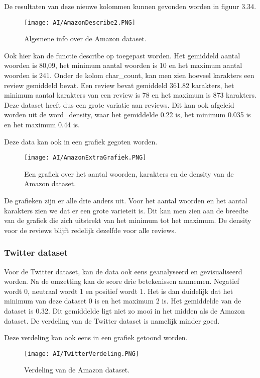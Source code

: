 De resultaten van deze nieuwe kolommen kunnen gevonden worden in figuur 3.34.

\begin{figure}[!htbp]
    \texttt{[image: AI/AmazonDescribe2.PNG]}
    \caption{\label{amazondescribe2}Algemene info over de Amazon dataset.}
\end{figure}
\FloatBarrier

Ook hier kan de functie describe op toegepast worden. Het gemiddeld aantal woorden is 80,09, het minimum aantal woorden is 10 en het maximum aantal woorden is 241. Onder de kolom char\_count, kan men zien hoeveel karakters een review gemiddeld bevat. Een review bevat gemiddeld 361.82 karakters, het minimum aantal karakters van een review is 78 en het maximum is 873 karakters. Deze dataset heeft dus een grote variatie aan reviews. Dit kan ook afgeleid worden uit de word\_density, waar het gemiddelde 0.22 is, het minimum 0.035 is en het maximum 0.44 is.

Deze data kan ook in een grafiek gegoten worden.

\begin{figure}[!htbp]
    \texttt{[image: AI/AmazonExtraGrafiek.PNG]}
    \caption{\label{amazongrafiek}Een grafiek over het aantal woorden, karakters en de density van de Amazon dataset.}
\end{figure}
\FloatBarrier


De grafieken zijn er alle drie anders uit. Voor het aantal woorden en het aantal karakters zien we dat er een grote varieteit is. Dit kan men zien aan de breedte van de grafiek die zich uitstrekt van het minimum tot het maximum. De density voor de reviews blijft redelijk dezelfde voor alle reviews. 


\subsubsection{Twitter dataset}
Voor de Twitter dataset, kan de data ook eens geanalyseerd en gevisualiseerd worden. Na de omzetting kan de score drie betekenissen aannemen. Negatief wordt 0, neutraal wordt 1 en positief wordt 1. Het is dan duidelijk dat het minimum van deze dataset 0 is en het maximum 2 is. Het gemiddelde van de dataset is 0.32. Dit gemiddelde ligt niet zo mooi in het midden als de Amazon dataset. De verdeling van de Twitter dataset is namelijk minder goed. 

Deze verdeling kan ook eens in een grafiek getoond worden.

 \begin{figure}[!htbp]
     \texttt{[image: AI/TwitterVerdeling.PNG]}
     \caption{\label{twittergrafiek}Verdeling van de Amazon dataset.}
 \end{figure}
 \FloatBarrier
 
